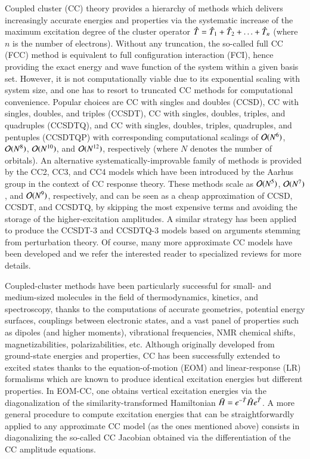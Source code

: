 \documentclass[aip,jcp,reprint,noshowkeys,superscriptaddress]{revtex4-1}
\newcommand{\hH}{\Hat{H}}
\newcommand{\hT}{\Hat{T}}
\newcommand{\bH}{\Bar{H}}
\begin{document}
Coupled cluster (CC) theory provides a hierarchy of methods which delivers increasingly accurate energies and properties via the systematic increase of the maximum excitation degree of the cluster operator $\hT = \hT_1 + \hT_2 + \ldots + \hT_n$ (where $n$ is the number of electrons).
Without any truncation, the so-called full CC (FCC) method is equivalent to full configuration interaction (FCI), hence providing the exact energy and wave function of the system within a given basis set.
However, it is not computationally viable due to its exponential scaling with system size, and one has to resort to truncated CC methods for computational convenience.
Popular choices are CC with singles and doubles (CCSD), CC with singles, doubles, and triples (CCSDT), CC with singles, doubles, triples, and quadruples (CCSDTQ), and 
CC with singles, doubles, triples, quadruples, and pentuples (CCSDTQP) with corresponding computational scalings of $\order*{N^{6}}$, $\order*{N^{8}}$,  $\order*{N^{10}}$, and  $\order*{N^{12}}$, respectively (where $N$ denotes the number of orbitals).
An alternative systematically-improvable family of methods is provided by the CC2, CC3, and CC4 models which have been introduced by the Aarhus group in the context of CC response theory.
These methods scale as $\order*{N^{5}}$, $\order*{N^{7}}$, and $\order*{N^{9}}$, respectively, and can be seen as a cheap approximation of CCSD, CCSDT, and CCSDTQ, by skipping the most expensive terms and avoiding the storage of the higher-excitation amplitudes.
A similar strategy has been applied to produce the CCSDT-3 and CCSDTQ-3 models based on arguments stemming from perturbation theory.
Of course, many more approximate CC models have been developed and we refer the interested reader to specialized reviews for more details.

Coupled-cluster methods have been particularly successful for small- and medium-sized molecules in the field of thermodynamics, kinetics, and spectroscopy, thanks to the computations of accurate geometries, potential energy surfaces, couplings between electronic states, and a vast panel of properties such as dipoles (and higher moments), vibrational frequencies, NMR chemical shifts, magnetizabilities, polarizabilities, etc.
Although originally developed from ground-state energies and properties, CC has been successfully extended to excited states thanks to the equation-of-motion (EOM) and linear-response (LR) formalisms which are known to produce identical excitation energies but different properties.
In EOM-CC, one obtains vertical excitation energies via the diagonalization of the similarity-transformed Hamiltonian $\bH = e^{-\hT} \hH e^{\hT}$.
A more general procedure to compute excitation energies that can be straightforwardly applied to any approximate CC model (as the ones mentioned above) consists in diagonalizing the so-called CC Jacobian obtained via the differentiation of the CC amplitude equations.
\end{document}
